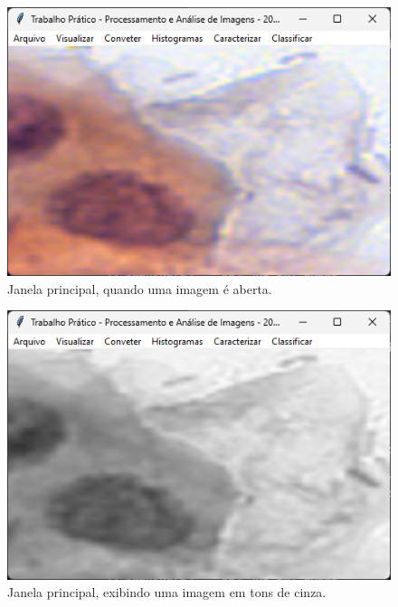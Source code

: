 \documentclass[12pt]{article}
\begin{document}
\begin{figure}
    \centering
    \includegraphics{Captura de tela 2024-06-10 094827.png}
    \caption{Janela principal, quando uma imagem é aberta.}
    \label{fig:janela-principal-imagem-aberta}
\end{figure}

\begin{figure}
    \centering
    \includegraphics{Captura de tela 2024-06-10 094843.png}
    \caption{Janela principal, exibindo uma imagem em tons de cinza.}
    \label{fig:janela-principal-tons-cinza}
\end{figure}
\end{document}
